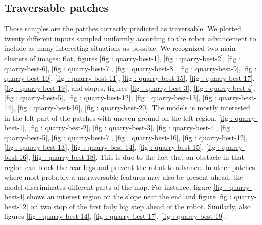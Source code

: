 \documentclass[../document.tex]{subfiles}
\begin{document}
\subsection{Traversable patches}
Those samples are the patches correctly predicted as traversable. We plotted twenty different inputs sampled uniformly according to the robot advancement to include as many interesting situations as possible. We recognized two main clusters of images: flat, figures \ref{fig : quarry-best-1},  \ref{fig : quarry-best-2},  \ref{fig : quarry-best-6},  \ref{fig : quarry-best-7},  \ref{fig : quarry-best-8},  \ref{fig : quarry-best-9},  \ref{fig : quarry-best-10},  \ref{fig : quarry-best-11},  \ref{fig : quarry-best-15},  \ref{fig : quarry-best-17},  \ref{fig : quarry-best-19}, and slopes, figures  \ref{fig : quarry-best-3},  \ref{fig : quarry-best-4},  \ref{fig : quarry-best-5},  \ref{fig : quarry-best-12},  \ref{fig : quarry-best-13},  \ref{fig : quarry-best-14},  \ref{fig : quarry-best-16},  \ref{fig : quarry-best-20}. The models is mostly interested in the left part of the patches with uneven ground on the left region, \ref{fig : quarry-best-1}, \ref{fig : quarry-best-2}, \ref{fig : quarry-best-3}, \ref{fig : quarry-best-4}, \ref{fig : quarry-best-5}, \ref{fig : quarry-best-7}, \ref{fig : quarry-best-10}, \ref{fig : quarry-best-12}, \ref{fig : quarry-best-13}, \ref{fig : quarry-best-14}, \ref{fig : quarry-best-15}, \ref{fig : quarry-best-16}, \ref{fig : quarry-best-18}. This is due to the fact that an obstacle in that region can block the rear legs and prevent the robot to advance. In other patches where most probably a untraversable features may also be present ahead, the model discriminates different parts of the map. For instance, figure \ref{fig : quarry-best-4} shows an interest region on the slope near the end and figure  \ref{fig : quarry-best-12} on two stop of the first faily big step ahead of the robot. Similarly, also figures  \ref{fig : quarry-best-14},  \ref{fig : quarry-best-17},  \ref{fig : quarry-best-19}.
\end{document}
